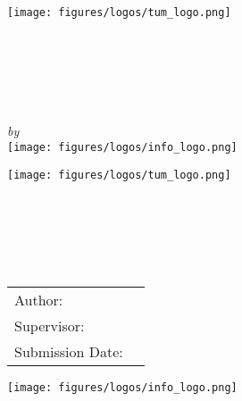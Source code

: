 \begin{titlepage}
	\makeatletter
	\begin{center}
		\texttt{[image: figures/logos/tum\_logo.png]}\\[0.5cm]
		\begin{Huge}
			\MakeUppercase{\getFaculty}
		\end{Huge}\\[0.5cm]
		\begin{large}
			\MakeUppercase{\getUniversity}
		\end{large}\\[1cm]
		\begin{Large}
			\getDoctype%
		\end{Large}\\[2cm]
		\begin{huge}
			\@title\par
		\end{huge}
		\vspace{5mm}
		\emph{by}\\
		\getAuthor%
		\vfill
		\texttt{[image: figures/logos/info\_logo.png]}\\
	\end{center}
	\newpage
	\thispagestyle{empty}
	\begin{center}
		\texttt{[image: figures/logos/tum\_logo.png]}\\[0.5cm]
		\begin{Huge}
			\MakeUppercase{\getFaculty}
		\end{Huge}\\[0.5cm]
		\begin{large}
			\MakeUppercase{\getUniversity}
		\end{large}\\[1cm]
		\begin{Large}
			\getDoctype%
		\end{Large}\\[2cm]
		\begin{huge}
			\@title\par
		\end{huge}
		\vspace{5mm}
		\begin{huge}
			\@subtitle\par
		\end{huge}
		\vspace{10mm}
		\begin{tabular}{l l}
			Author:          & \getAuthor{}         \\
			Supervisor:      & \getSupervisor{}     \\
			Submission Date: & \getSubmissionDate{} \\
		\end{tabular}
		\vfill
		\texttt{[image: figures/logos/info\_logo.png]}\\
	\end{center}
	\makeatother
\end{titlepage}
